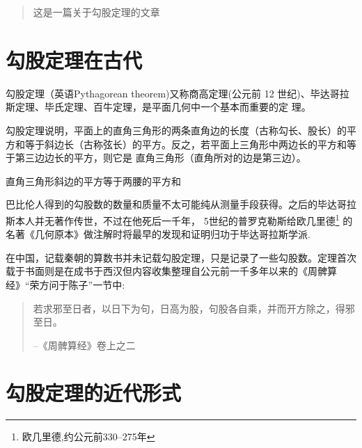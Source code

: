 \documentclass[UTF8]{ctexart}
\author{张三}
\date{\today}
\begin{document}
  \maketitle %
  \begin{abstract}
    这是一篇关于勾股定理的文章
  \end{abstract}
  \tableofcontents %
  \section{勾股定理在古代}
    勾股定理（英语Pythagorean theorem)又称商高定理(公元前 12 世纪)、毕达哥拉斯定理、毕氏定理、百牛定理，是平面几何中一个基本而重要的定 理。%

    勾股定理说明，平面上的直角三角形的两条直角边的长度（古称勾长、股长）的平方和等于斜边长（古称弦长）的平方。反之，若平面上三角形中两边长的平方和等于第三边边长的平方，则它是
    直角三角形（直角所对的边是第三边）。

    \begin{thm}[勾股定理]
      直角三角形斜边的平方等于两腰的平方和
    \end{thm}

    巴比伦人得到的勾股数的数量和质量不太可能纯从测量手段获得。之后的毕达哥拉斯本人并无著作传世，不过在他死后一千年，
    5世纪的普罗克勒斯给欧几里德\footnote{欧几里德,约公元前330--275年}
    的名著《几何原本》做注解时将最早的发现和证明归功于毕达哥拉斯学派.

    在中国，记载秦朝的算数书并未记载勾股定理，只是记录了一些勾股数。定理首次载于书面则是在成书于西汉但内容收集整理自公元前一千多年以来的《周髀算经》“荣方问于陈子”一节中:
    \begin{quote}%
    \kaishu%
      若求邪至日者，以日下为句，日高为股，句股各自乘，并而开方除之，得邪至日。

      --《周髀算经》卷上之二
    \end{quote}

  \section{勾股定理的近代形式}
\end{document}

